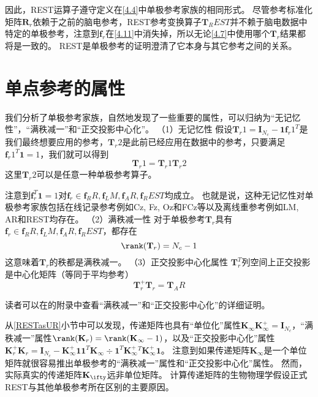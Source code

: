 因此，REST运算子遵守定义在\eqref{4.4}中单极参考家族的相同形式。 尽管参考标准化矩阵$\mathbf{R}_r$依赖于之前的脑电参考，REST参考变换算子$\mathbf{T}_REST$并不赖于脑电数据中特定的单极参考，注意到$\mathbf{f}_r$在\eqref{4.11}中消失掉，所以无论\eqref{4.7}中使用哪个$\mathbf{T}_r$结果都将是一致的。 REST是单极参考的证明澄清了它本身与其它参考之间的关系。

\section{单点参考的属性}
我们分析了单极参考家族，自然地发现了一些重要的属性，可以归纳为“无记忆性”，“满秩减一”和“正交投影中心化”。
（1）无记忆性
假设$\mathbf{T}_r1=\mathbf{I}_N_c-\mathbf{1f}_r1^T$是我们最终想要应用的参考，$\mathbf{T}_r2$是此前已经应用在数据中的参考，只要满足$\mathbf{f}_r1^T\mathbf{1}=1$，我们就可以得到
\begin{equation}\label{4.12}
\mathbf{T}_r1=\mathbf{T}_r1\mathbf{T}_r2
\end{equation}
这里$\mathbf{T}_r2$可以是任意一种单极参考算子。

注意到$\mathbf{f}_r^T\mathbf{1}=1$对$\mathbf{f}_r\in{\mathbf{f}_RR,\mathbf{f}_LM,\mathbf{f}_AR,\mathbf{f}_REST}$均成立。 也就是说，这种无记忆性对单极参考家族包括在线记录参考例如Cz, Fz, Oz和FCz等以及离线重参考例如LM, AR和REST均存在。
（2）满秩减一性
对于单极参考$\mathbf{T}_r$具有$\mathbf{f}_r\in{\mathbf{f}_RR,\mathbf{f}_LM,\mathbf{f}_AR,\mathbf{f}_REST}$，都存在
\begin{equation}\label{4.13}
\rank(\mathbf{T}_r)=N_c-1
\end{equation}
这意味着$\mathbf{T}_r$的秩都是满秩减一。
（3）正交投影中心化属性
$\mathbf{T}_r^T$列空间上正交投影是中心化矩阵（等同于平均参考）
\begin{equation}\label{4.14}
\mathbf{T}_r^+\mathbf{T}_r=\mathbf{T}_AR
\end{equation}

读者可以在\cite{hu_unified_2018}的附录中查看“满秩减一”和“正交投影中心化”的详细证明。

从\ref{RESTasUR}小节中可以发现，传递矩阵也具有“单位化”属性$\mathbf{K}_{\infty}\mathbf{K}_{\infty}^+=\mathbf{I}_N_c$，“满秩减一”属性$\rank(\mathbf{K}_r)=\rank(\mathbf{K}_{\infty}-1)$，以及“正交投影中心化”属性$\mathbf{K}_r^+\mathbf{K}_r=\mathbf{I}_N_c-\mathbf{K}_{\infty}^+\mathbf{11}^T\mathbf{K}_{\infty}\div{\mathbf{1}^T\mathbf{K}_{\infty}^+^T\mathbf{K}_{\infty}^+\mathbf{1}}$。 注意到如果传递矩阵$\mathbf{K}_{\infty}$是一个单位矩阵就很容易推出单极参考的“满秩减一”属性和“正交投影中心化”属性。 然而，实际真实的传递矩阵$\mathbf{K}_{\ifty}$远非单位矩阵。 计算传递矩阵的生物物理学假设正式REST与其他单极参考所在区别的主要原因。


